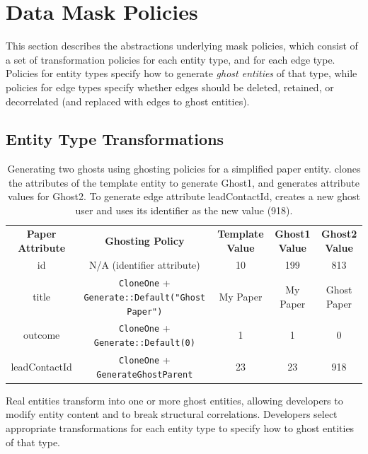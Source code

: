 \section{Data Mask Policies}
\label{sec:policies}

This section describes the abstractions underlying mask policies, which consist of a set of
transformation policies for each entity type, and for each edge type.
Policies for entity types specify how to generate \emph{ghost entities} of that type, while policies
for edge types specify whether edges should be deleted, retained, or decorrelated (and replaced with edges to ghost entities).

\subsection{Entity Type Transformations}
\label{sec:ghosting}

\begin{table}[t!]
    \centering
    \footnotesize
\begin{tabular}{@{}ccccc@{}}
\textbf{Paper Attribute} & \textbf{Ghosting Policy} & \textbf{Template Value} & \textbf{Ghost1 Value} & \textbf{Ghost2 Value} 
  \\ \cmidrule(r){1-5}
    {id} & N/A (identifier attribute) & 10 & 199 & 813 \\
{title} & \texttt{CloneOne} + \texttt{Generate::Default("Ghost Paper")} & My Paper & My
    Paper & Ghost Paper \\
{outcome} & \texttt{CloneOne} + \texttt{Generate::Default(0)} & 1 & 1 & 0 \\
{leadContactId} & \texttt{CloneOne} + \texttt{GenerateGhostParent} & 23 & 23 & 918 \\
\end{tabular}
    \caption{Generating two ghosts using ghosting policies for a simplified paper entity.
    \sys clones the attributes of the template entity to generate Ghost1, and generates
    attribute values for Ghost2. To generate edge attribute leadContactId, \sys creates a new ghost user and uses its identifier as the new value (918).}
    \label{tab:ghosting}
\end{table}

Real entities transform into one or more ghost entities, allowing developers to modify entity
content and to break structural correlations. 
Developers select appropriate transformations for each entity type to specify how to
ghost entities of that type.

